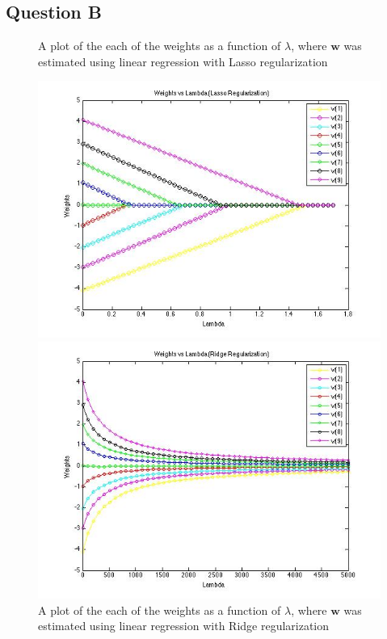 \documentclass{article}
\newcommand*{\wb}{\ensuremath{\mathbf{w}}}
\begin{document}
\subsection*{Question B}
\begin{figure}[p]
\caption{A plot of the each of the weights as a function of $\lambda$, where
    $\wb$ was estimated using linear regression with Lasso regularization}
\includegraphics[width=14.8cm]{lasso_weights}
\caption{A plot of the each of the weights as a function of $\lambda$, where
    $\wb$ was estimated using linear regression with Ridge regularization}
\includegraphics[width=14.8cm]{ridge_weights}
\end{figure}
\clearpage
\end{document}
